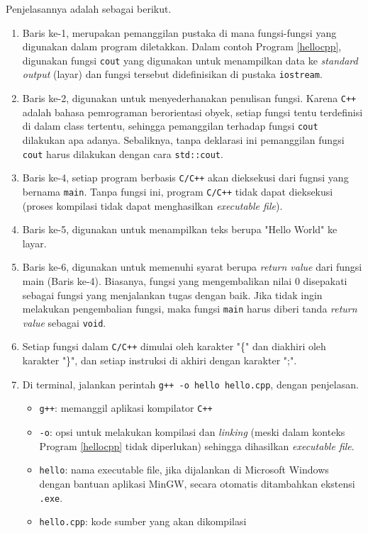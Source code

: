 Penjelasannya adalah sebagai berikut.
\begin{enumerate}
\item Baris ke-1, merupakan pemanggilan pustaka di mana fungsi-fungsi yang digunakan dalam program diletakkan. Dalam contoh Program \ref{hellocpp}, digunakan fungsi \texttt{cout} yang digunakan untuk menampilkan data ke \textit{standard output} (layar) dan fungsi tersebut didefinisikan di pustaka \texttt{iostream}.
\item Baris ke-2, digunakan untuk menyederhanakan penulisan fungsi. Karena \texttt{C++} adalah bahasa pemrograman berorientasi obyek, setiap fungsi tentu terdefinisi di dalam class tertentu, sehingga pemanggilan terhadap fungsi \texttt{cout} dilakukan apa adanya. Sebaliknya, tanpa deklarasi ini pemanggilan fungsi \texttt{cout} harus dilakukan dengan cara \texttt{std::cout}.
\item Baris ke-4, setiap program berbasis \texttt{C/C++} akan dieksekusi dari fugnsi yang bernama \texttt{main}. Tanpa fungsi ini, program \texttt{C/C++} tidak dapat dieksekusi (proses kompilasi tidak dapat menghasilkan \textit{executable file}).
\item Baris ke-5, digunakan untuk menampilkan teks berupa "Hello World" ke layar.
\item Baris ke-6, digunakan untuk memenuhi syarat berupa \textit{return value} dari fungsi main (Baris ke-4). Biasanya, fungsi yang mengembalikan nilai $0$ disepakati sebagai fungsi yang menjalankan tugas dengan baik. Jika tidak ingin melakukan pengembalian fungsi, maka fungsi \texttt{main} harus diberi tanda \textit{return value} sebagai \texttt{void}.
\item Setiap fungsi dalam \texttt{C/C++} dimulai oleh karakter "\{" dan diakhiri oleh karakter "\}", dan setiap instruksi di akhiri dengan karakter ";".
\item Di terminal, jalankan perintah \texttt{g++ -o hello hello.cpp}, dengan penjelasan.
\begin{itemize}
\item \texttt{g++}: memanggil aplikasi kompilator \texttt{C++}
\item \texttt{-o}: opsi untuk melakukan kompilasi dan \textit{linking} (meski dalam konteks Program \ref{hellocpp} tidak diperlukan) sehingga dihasilkan \textit{executable file}.
\item \texttt{hello}: nama executable file, jika dijalankan di Microsoft Windows dengan bantuan aplikasi MinGW, secara otomatis ditambahkan ekstensi \texttt{.exe}.
\item \texttt{hello.cpp}: kode sumber yang akan dikompilasi
\end{itemize}
\end{enumerate}

